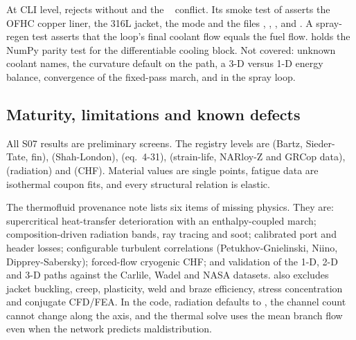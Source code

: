 At CLI level,  rejects  without  and the ~ conflict. Its smoke test of  asserts the OFHC copper liner, the 316L jacket, the  mode and the files , , ,  and . A spray-regen test asserts that the loop's final coolant flow equals the fuel flow.  holds the NumPy parity test for the differentiable cooling block. Not covered: unknown coolant names, the curvature default on the  path, a 3-D versus 1-D energy balance, convergence of the fixed-pass march, and  in the spray loop.

\subsection{Maturity, limitations and known defects}\label{sec:s07-defects}

 All S07 results are preliminary screens. The registry levels are  (Bartz, Sieder-Tate, fin),  (Shah-London),  (eq.\ 4-31),  (strain-life, NARloy-Z and GRCop data),  (radiation) and  (CHF). Material values are single points, fatigue data are isothermal coupon fits, and every structural relation is elastic.

 The thermofluid provenance note lists six items of missing physics. They are: supercritical heat-transfer deterioration with an enthalpy-coupled march; composition-driven radiation bands, ray tracing and soot; calibrated port and header losses; configurable turbulent correlations (Petukhov-Gnielinski, Niino, Dipprey-Sabersky); forced-flow cryogenic CHF; and validation of the 1-D, 2-D and 3-D paths against the Carlile, Wadel and NASA datasets.  also excludes jacket buckling, creep, plasticity, weld and braze efficiency, stress concentration and conjugate CFD/FEA. In the code, radiation defaults to , the channel count cannot change along the axis, and the thermal solve uses the mean branch flow even when the network predicts maldistribution.

